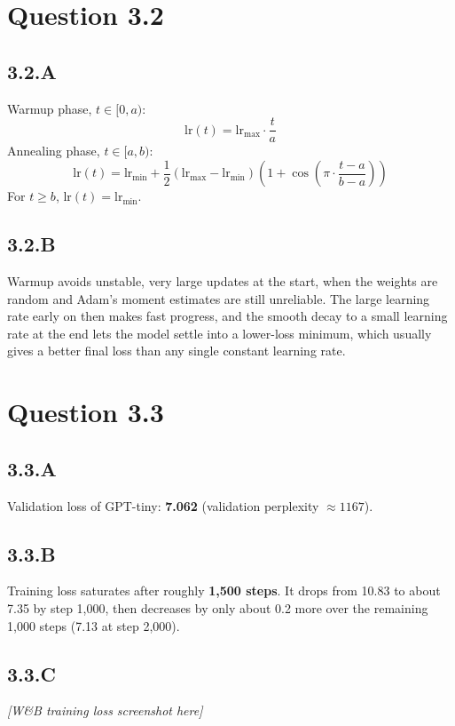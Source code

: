 \documentclass{article}
\begin{document}
\section*{Question 3.2}

\subsection*{3.2.A}
Warmup phase, $t \in [0, a)$:
\[
\text{lr}(t) = \text{lr}_{\max} \cdot \frac{t}{a}
\]
Annealing phase, $t \in [a, b)$:
\[
\text{lr}(t) = \text{lr}_{\min} + \frac{1}{2}\left(\text{lr}_{\max} - \text{lr}_{\min}\right)\left(1 + \cos\!\left(\pi \cdot \frac{t - a}{b - a}\right)\right)
\]
For $t \geq b$, $\text{lr}(t) = \text{lr}_{\min}$.

\subsection*{3.2.B}
Warmup avoids unstable, very large updates at the start, when the weights are random and Adam's moment estimates are still unreliable. The large learning rate early on then makes fast progress, and the smooth decay to a small learning rate at the end lets the model settle into a lower-loss minimum, which usually gives a better final loss than any single constant learning rate.

\section*{Question 3.3}

\subsection*{3.3.A}
Validation loss of GPT-tiny: \textbf{7.062} (validation perplexity $\approx 1167$).

\subsection*{3.3.B}
Training loss saturates after roughly \textbf{1,500 steps}. It drops from 10.83 to about 7.35 by step 1,000, then decreases by only about 0.2 more over the remaining 1,000 steps (7.13 at step 2,000).

\subsection*{3.3.C}
\begin{center}
  \textit{[W\&B training loss screenshot here]}
\end{center}
\end{document}
